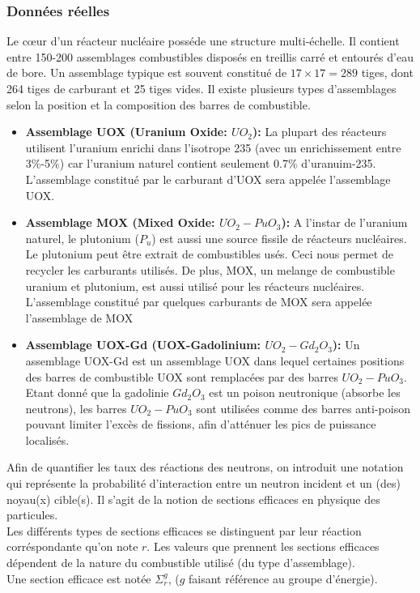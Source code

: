 \subsubsection{Données réelles}
Le cœur d'un réacteur nucléaire posséde une structure multi-échelle. Il contient entre 150-200 assemblages combustibles disposés en treillis carré
et entourés d'eau de bore. Un assemblage typique est souvent constitué de $17 \times 17=289$ tiges, dont 264 tiges de carburant et 25 tiges vides.
Il existe plusieurs types d'assemblages selon la position et la composition des barres de combustible.
\begin{itemize}
\item \textbf{Assemblage UOX (Uranium Oxide: $UO_2$):}
La plupart des réacteurs utilisent l'uranium enrichi dans l'isotrope 235 (avec un enrichissement entre 3\%-5\%) car l'uranium naturel contient seulement 0.7\% d'uranuim-235.
L'assemblage constitué par le carburant d'UOX sera appelée l'assemblage UOX.

\item \textbf{Assemblage MOX (Mixed Oxide: $UO_2-PuO_3$):}
A l'instar de l'uranium naturel, le plutonium ($P_u$) est aussi une source fissile de réacteurs nucléaires.
Le plutonium peut être extrait de combustibles usés. Ceci nous permet de recycler les carburants utilisés.
De plus, MOX, un melange de combustible uranium et plutonium, est aussi utilisé pour les réacteurs nucléaires.
L'assemblage constitué par quelques carburants de MOX sera appelée l'assemblage de MOX

\item \textbf{Assemblage UOX-Gd (UOX-Gadolinium: $UO_2-Gd_2O_3$):}
Un assemblage UOX-Gd est un assemblage UOX dans lequel certaines positions des barres de combustible UOX sont remplacées par des barres $UO_2-PuO_3$.
Etant donné que la gadolinie $Gd_2O_3$ est un poison neutronique (absorbe les neutrons), les barres $UO_2-PuO_3$ sont utilisées comme des barres anti-poison
pouvant limiter l'excès de fissions, afin d'atténuer les pics de puissance localisés.
\end{itemize}

\vspace{0.5cm}
\hspace{0.5cm}
Afin de quantifier les taux des réactions des neutrons, on introduit une notation qui représente la probabilité d'interaction entre un neutron incident et un (des) noyau(x) cible(s).
Il s'agit de la notion de sections efficaces en physique des particules.\\
Les différents types de sections efficaces se distinguent par leur réaction corréspondante qu'on note $r$.
Les valeurs que prennent les sections efficaces dépendent de la nature du combustible utilisé (du type d'assemblage).\\
Une section efficace est notée $\Sigma_r^g$, ($g$ faisant référence au groupe d'énergie).\\


